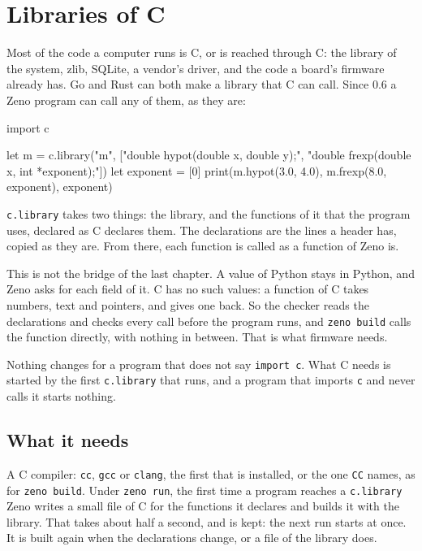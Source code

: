 \chapter{Libraries of C}\label{ch-c-libraries}

Most of the code a computer runs is C, or is reached through C: the
library of the system, zlib, SQLite, a vendor's driver, and the code a
board's firmware already has. Go and Rust can both make a library
that C can call. Since 0.6 a Zeno program can call any of them, as
they are:

\begin{zeno}[file=maths.zeno, dir=maths]
import c

let m = c.library("m", ["double hypot(double x, double y);", "double frexp(double x, int *exponent);"])
let exponent = [0]
print(m.hypot(3.0, 4.0), m.frexp(8.0, exponent), exponent)
\end{zeno}

\verb|c.library| takes two things: the library, and the functions of
it that the program uses, declared as C declares them. The
declarations are the lines a header has, copied as they are. From
there, each function is called as a function of Zeno is.

This is not the bridge of the last chapter. A value of Python stays
in Python, and Zeno asks for each field of it. C has no such values:
a function of C takes numbers, text and pointers, and gives one back.
So the checker reads the declarations and checks every call before the
program runs, and \verb|zeno build| calls the function directly, with
nothing in between. That is what firmware needs.

\begin{note}
Nothing changes for a program that does not say \verb|import c|. What
C needs is started by the first \verb|c.library| that runs, and a
program that imports \verb|c| and never calls it starts nothing.
\end{note}

\section{What it needs}

A C compiler: \verb|cc|, \verb|gcc| or \verb|clang|, the first that is
installed, or the one \verb|CC| names, as for \verb|zeno build|. Under
\verb|zeno run|, the first time a program reaches a \verb|c.library|
Zeno writes a small file of C for the functions it declares and builds
it with the library. That takes about half a second, and is kept: the
next run starts at once. It is built again when the declarations
change, or a file of the library does.

